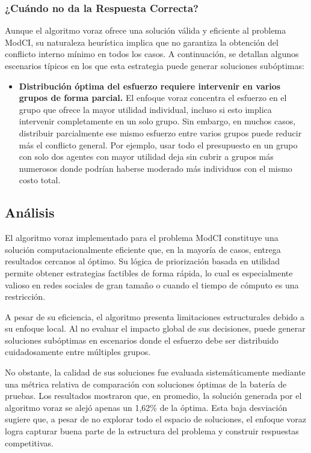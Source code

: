 \documentclass[11pt,letter]{article}
\begin{document}
        \subsubsection{¿Cuándo no da la Respuesta Correcta?}

    Aunque el algoritmo voraz ofrece una solución válida y eficiente al problema ModCI, su naturaleza heurística implica que no garantiza la obtención del conflicto interno mínimo en todos los casos. A continuación, se detallan algunos escenarios típicos en los que esta estrategia puede generar soluciones subóptimas:


    \begin{itemize}

    \item \textbf{Distribución óptima del esfuerzo requiere intervenir en varios grupos de forma parcial.}
    El enfoque voraz concentra el esfuerzo en el grupo que ofrece la mayor utilidad individual, incluso si esto implica intervenir completamente en un solo grupo. Sin embargo, en muchos casos, distribuir parcialmente ese mismo esfuerzo entre varios grupos puede reducir más el conflicto general. Por ejemplo, usar todo el presupuesto en un grupo con solo dos agentes con mayor utilidad deja sin cubrir a grupos más numerosos donde podrían haberse moderado más individuos con el mismo costo total.

    \end{itemize}




    \subsection{Análisis}
    El algoritmo voraz implementado para el problema ModCI constituye una solución computacionalmente eficiente que, en la mayoría de casos, entrega resultados cercanos al óptimo. Su lógica de priorización basada en utilidad permite obtener estrategias factibles de forma rápida, lo cual es especialmente valioso en redes sociales de gran tamaño o cuando el tiempo de cómputo es una restricción.

    A pesar de su eficiencia, el algoritmo presenta limitaciones estructurales debido a su enfoque local. Al no evaluar el impacto global de sus decisiones, puede generar soluciones subóptimas en escenarios donde el esfuerzo debe ser distribuido cuidadosamente entre múltiples grupos.

    No obstante, la calidad de sus soluciones fue evaluada sistemáticamente mediante una métrica relativa de comparación con soluciones óptimas de la batería de pruebas. Los resultados mostraron que, en promedio, la solución generada por el algoritmo voraz se alejó apenas un 1{,}62\% de la óptima. Esta baja desviación sugiere que, a pesar de no explorar todo el espacio de soluciones, el enfoque voraz logra capturar buena parte de la estructura del problema y construir respuestas competitivas.
\end{document}
